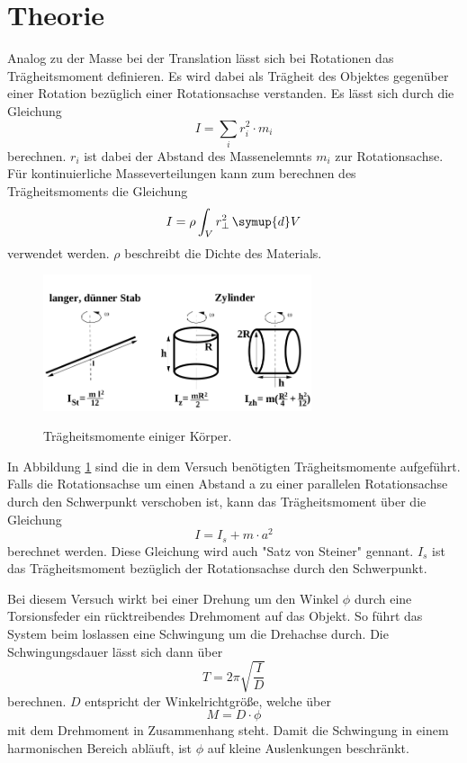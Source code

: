 \section{Theorie}
\label{sec:Theorie}
Analog zu der Masse bei der Translation lässt sich bei Rotationen das Trägheitsmoment definieren. Es wird dabei als Trägheit des Objektes gegenüber einer Rotation bezüglich einer Rotationsachse verstanden. Es lässt sich durch die Gleichung 
\begin{equation}
    I=\sum_{i}r_i^2\cdot m_i
\end{equation}
berechnen. $r_i$ ist dabei der Abstand des Massenelemnts $m_i$ zur Rotationsachse.
Für kontinuierliche Masseverteilungen kann zum berechnen des Trägheitsmoments die Gleichung
\begin{equation}
    I=\rho\int_V r_\perp^2 \,\symup{d}V
\end{equation}
verwendet werden. $\rho$ beschreibt die Dichte des Materials.


\begin{figure}
    \caption{Trägheitsmomente einiger Körper.}
    \centering
    \includegraphics[height=4cm]{data/Probekoerper.png}
    \label{fig:probe}
\end{figure}


In Abbildung \ref{fig:probe} sind die in dem Versuch benötigten Trägheitsmomente aufgeführt. 
Falls die Rotationsachse um einen Abstand a zu einer parallelen Rotationsachse durch den Schwerpunkt verschoben ist, kann das Trägheitsmoment über die Gleichung
\begin{equation}
    I=I_s+m\cdot a^2
\end{equation}
berechnet werden. Diese Gleichung wird auch "Satz von Steiner" gennant.  $I_s$ ist das Trägheitsmoment bezüglich der Rotationsachse durch den Schwerpunkt.


Bei diesem Versuch wirkt bei einer Drehung um den Winkel $\phi$ durch eine Torsionsfeder ein rücktreibendes Drehmoment auf das Objekt. So führt das System beim loslassen eine Schwingung um die Drehachse durch. Die Schwingungsdauer lässt sich dann über 
\begin{equation}
\label{eqn:T}
    T=2\pi \sqrt{\frac{I}{D}}
\end{equation}
berechnen. $D$ entspricht der Winkelrichtgröße, welche über  
\begin{equation}
\label{eqn:M}
    M=D\cdot \phi
\end{equation}
mit dem Drehmoment in Zusammenhang steht.
Damit die Schwingung in einem harmonischen Bereich abläuft, ist $\phi$ auf kleine Auslenkungen beschränkt.


